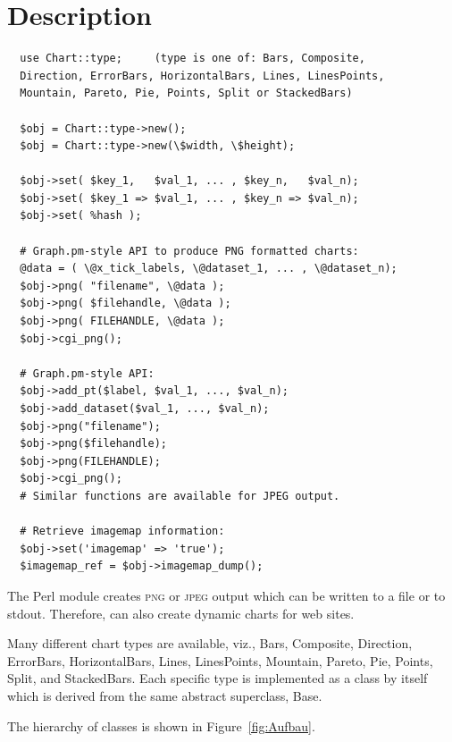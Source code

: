 \clearpage
\section{Description}
\synopsis

\begin{verbatim}
  use Chart::type;     (type is one of: Bars, Composite,
  Direction, ErrorBars, HorizontalBars, Lines, LinesPoints,
  Mountain, Pareto, Pie, Points, Split or StackedBars)

  $obj = Chart::type->new();
  $obj = Chart::type->new(\$width, \$height);

  $obj->set( $key_1,   $val_1, ... , $key_n,   $val_n);
  $obj->set( $key_1 => $val_1, ... , $key_n => $val_n);
  $obj->set( %hash );

  # Graph.pm-style API to produce PNG formatted charts:
  @data = ( \@x_tick_labels, \@dataset_1, ... , \@dataset_n);
  $obj->png( "filename", \@data );
  $obj->png( $filehandle, \@data );
  $obj->png( FILEHANDLE, \@data );
  $obj->cgi_png();

  # Graph.pm-style API:
  $obj->add_pt($label, $val_1, ..., $val_n);
  $obj->add_dataset($val_1, ..., $val_n);
  $obj->png("filename");
  $obj->png($filehandle);
  $obj->png(FILEHANDLE);
  $obj->cgi_png();
  # Similar functions are available for JPEG output.

  # Retrieve imagemap information:
  $obj->set('imagemap' => 'true');
  $imagemap_ref = $obj->imagemap_dump();

\end{verbatim}
\clearpage

The Perl module  creates \textsc{png} or \textsc{jpeg}
output which can be written to a file or to stdout. Therefore,
 can also create dynamic charts for web sites.

Many different chart types are available, viz., Bars,
Composite, Direction, ErrorBars, HorizontalBars, Lines, LinesPoints,
Mountain, Pareto, Pie, Points, Split, and StackedBars. Each
specific type is implemented as a class by itself which is
derived from the same abstract superclass, Base.

The hierarchy of  classes is shown in
Figure~\ref{fig:Aufbau}.

